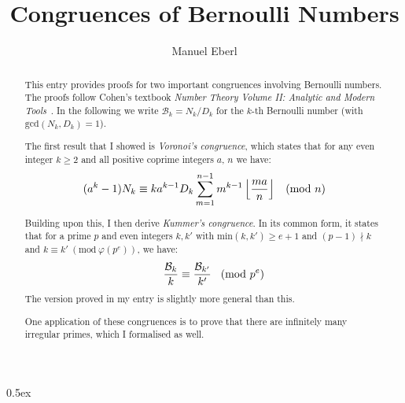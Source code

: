 \documentclass[11pt,a4paper]{article}
\begin{document}
\title{Congruences of Bernoulli Numbers}
\author{Manuel Eberl}
\maketitle

\begin{abstract}
This entry provides proofs for two important congruences involving Bernoulli numbers.
The proofs follow Cohen's textbook \emph{Number Theory Volume II: Analytic and Modern Tools}~\cite{cohen2007}.
In the following we write $\mathcal{B}_k = N_k / D_k$ for the $k$-th Bernoulli number (with $\text{gcd}(N_k, D_k) = 1$).

The first result that I showed is \emph{Voronoi's congruence}, which states that for any even integer
$k\geq 2$ and all positive coprime integers $a$, $n$ we have:
\[(a^k - 1) N_k \equiv k a^{k-1} D_k \sum_{m=1}^{n-1} m^{k-1} \left\lfloor\frac{ma}{n}\right\rfloor
\hspace*{3mm}(\text{mod}\ n)\]

Building upon this, I then derive \emph{Kummer's congruence}. In its common form, it states that 
for a prime $p$ and even integers $k,k'$ with $\text{min}(k,k')\geq e+1$ and $(p - 1) \nmid k$ and
$k \equiv k'\ (\text{mod}\ \varphi(p^e))$, we have:
\[\hspace*{6mm}\frac{\mathcal{B}_k}{k} \equiv \frac{\mathcal{B}_{k'}}{k'}\hspace*{3mm}(\text{mod}\ p^e)\]
The version proved in my entry is slightly more general than this.

One application of these congruences is to prove that there are infinitely many irregular primes,
which I formalised as well.
\end{abstract}

\newpage
\tableofcontents

\newpage
\parindent 0pt\parskip 0.5ex



\raggedright


\end{document}
